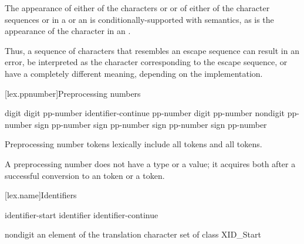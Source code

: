 \pnum
The appearance of either of the characters  or \tcode{\textbackslash} or of
either of the character sequences \tcode{/*} or \tcode{//} in a
 or an 
is conditionally-supported with  semantics, as is the appearance of the character
 in an .
\begin{footnote}
Thus, a sequence of characters
that resembles an escape sequence can result in an error, be interpreted as the
character corresponding to the escape sequence, or have a completely different meaning,
depending on the implementation.
\end{footnote}

[lex.ppnumber]{Preprocessing numbers}

%
\begin{bnf}
\br
    digit\br
     digit\br
    pp-number identifier-continue\br
    pp-number  digit\br
    pp-number  nondigit\br
    pp-number  sign\br
    pp-number  sign\br
    pp-number  sign\br
    pp-number  sign\br
    pp-number 
\end{bnf}

\pnum
Preprocessing number tokens lexically include
all  tokens and
all  tokens.

\pnum
A preprocessing number does not have a type or a value; it acquires both
after a successful conversion to
an  token or
a  token.%

[lex.name]{Identifiers}

%
\begin{bnf}
\br
    identifier-start\br
    identifier identifier-continue
\end{bnf}

\begin{bnf}
\br
    nondigit\br
    \textnormal{an element of the translation character set of class XID_Start}
\end{bnf}

